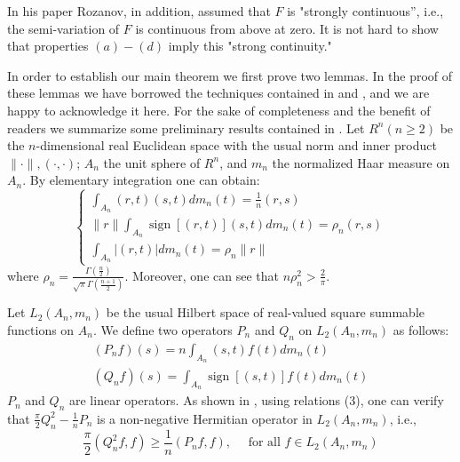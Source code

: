 \documentclass{article}
\begin{document}
In his paper \cite{rozanov} Rozanov, in addition, assumed that $F$ is "strongly continuous'', i.e., the semi-variation of $F$ is continuous from above at zero. It is not hard to show that properties $(a)-(d)$ imply this "strong continuity."

In order to establish our main theorem we first prove two lemmas. In the proof of these lemmas we have borrowed the techniques contained in \cite{pietsch} and \cite{rogge}, and we are happy to acknowledge it here. For the sake of completeness and the benefit of readers we summarize some preliminary results contained in \cite{rogge}. Let $R^{n}(n \geq 2)$ be the $n$-dimensional real Euclidean space with the usual norm and inner product $\|\cdot\|,(\cdot, \cdot)$; $A_{n}$ the unit sphere of $R^{n}$, and $m_{n}$ the normalized Haar measure on $A_{n}$. By elementary integration one can obtain:
\begin{equation}
\left\{\begin{array}{l}
\int_{A_{n}}(r, t)(s, t) d m_{n}(t)=\frac{1}{n}(r, s) \\
\|r\| \int_{A_{n}} \operatorname{sign}[(r, t)](s, t) d m_{n}(t)=\rho_{n}(r, s) \\
\int_{A_{n}}|(r, t)| d m_{n}(t)=\rho_{n}\|r\|
\end{array}\right.
\end{equation}
where $\rho_{n}=\frac{\Gamma\left(\frac{n}{2}\right)}{\sqrt{\pi} \Gamma\left(\frac{n+1}{2}\right)}$. Moreover, one can see that $n \rho_{n}^{2}>\frac{2}{\pi}$.

Let $L_{2}(A_{n}, m_{n})$ be the usual Hilbert space of real-valued square summable functions on $A_{n}$. We define two operators $P_{n}$ and $Q_{n}$ on $L_{2}(A_{n}, m_{n})$ as follows:
\begin{equation}
\begin{gathered}
(P_{n} f)(s)=n \int_{A_{n}}(s, t) f(t) d m_{n}(t) \\
(Q_{n} f)(s)=\int_{A_{n}} \operatorname{sign}[(s, t)] f(t) d m_{n}(t)
\end{gathered}
\end{equation}
$P_{n}$ and $Q_{n}$ are linear operators. As shown in \cite{rogge}, using relations (3), one can verify that $\frac{\pi}{2} Q_{n}^{2}-\frac{1}{n} P_{n}$ is a non-negative Hermitian operator in $L_{2}(A_{n}, m_{n})$, i.e.,
\begin{equation}
\frac{\pi}{2}(Q_{n}^{2} f, f) \geq \frac{1}{n}(P_{n} f, f), \quad \text{ for all } f \in L_{2}(A_{n}, m_{n})
\end{equation}
\end{document}

